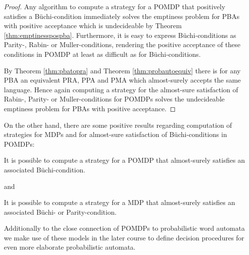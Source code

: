 \begin{proof}
  Any algorithm to compute a strategy for a \ac{POMDP} that positively 
  satisfies a Büchi-condition immediately solves the emptiness problem for
  \acp{PBA} with positive acceptance which is undecideable by Theorem 
  \ref{thm:emptinesspospba}. Furthermore, it is easy to express 
  Büchi-conditions as Parity-, Rabin- or Muller-conditions, rendering the 
  positive acceptance of these conditions in \ac{POMDP} at least as difficult
  as for Büchi-conditions. 
  
  By Theorem \ref{thm:pbatopra} and Theorem \ref{thm:probautoequiv} there is 
  for any \ac{PBA} an equivalent \ac{PRA}, \ac{PPA} and \ac{PMA} which 
  almost-surely accepts the same language. Hence again computing a strategy for 
  the almost-sure satisfaction of Rabin-, Parity- or Muller-conditions for 
  \acp{POMDP} solves the undecideable emptiness problem for \acp{PBA} with 
  positive acceptance.
\end{proof}
On the other hand, there are some positive results regarding computation of 
strategies for \acp{MDP} and for almost-sure satisfaction of Büchi-conditions
in \acp{POMDP}:
\begin{theorem}
  \cite[Theorem 5]{QualAnaPOMDP}
  It is possible to compute a strategy for a \ac{POMDP} that almost-surely 
  satisfies an associated Büchi-condition.
\end{theorem}
and
\begin{theorem}
  \cite[Theorem 4.1.7.]{QuanStochParityGames}
  It is possible to compute a strategy for a \ac{MDP} that almost-surely
  satisfies an associated Büchi- or Parity-condition.
\end{theorem} 
Additionally to the close connection of \acp{POMDP} to probabilistic word 
automata we make use of these models in the later course to define decision
procedures for even more elaborate probabilistic automata.

